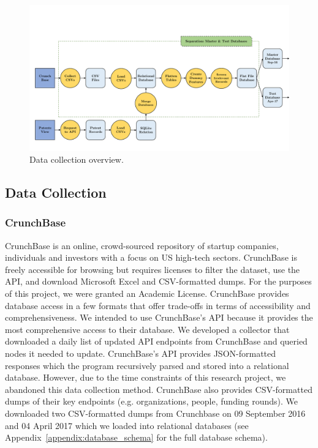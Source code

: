 \documentclass[../thesis/thesis.tex]{subfiles}
\begin{document}
\begin{figure}[!htb]
    \centering
    \includegraphics[width=\textwidth]{../figures/design/data_collection}
    \caption[Data collection flowchart]{Data collection overview.}
    \label{fig:design:data_collection}
\end{figure}


\subsection{Data Collection}

\subsubsection{CrunchBase}

CrunchBase is an online, crowd-sourced repository of startup companies, individuals and investors with a focus on US high-tech sectors. CrunchBase is freely accessible for browsing but requires licenses to filter the dataset, use the API, and download Microsoft Excel and CSV-formatted dumps. For the purposes of this project, we were granted an Academic License. CrunchBase provides database access in a few formats that offer trade-offs in terms of accessibility and comprehensiveness. We intended to use CrunchBase's API because it provides the most comprehensive access to their database. We developed a collector that downloaded a daily list of updated API endpoints from CrunchBase and queried nodes it needed to update. CrunchBase's API provides JSON-formatted responses which the program recursively parsed and stored into a relational database. However, due to the time constraints of this research project, we abandoned this data collection method. CrunchBase also provides CSV-formatted dumps of their key endpoints (e.g. organizations, people, funding rounds). We downloaded two CSV-formatted dumps from Crunchbase on 09 September 2016 and 04 April 2017 which we loaded into relational databases (see Appendix~\ref{appendix:database_schema} for the full database schema).
\end{document}

